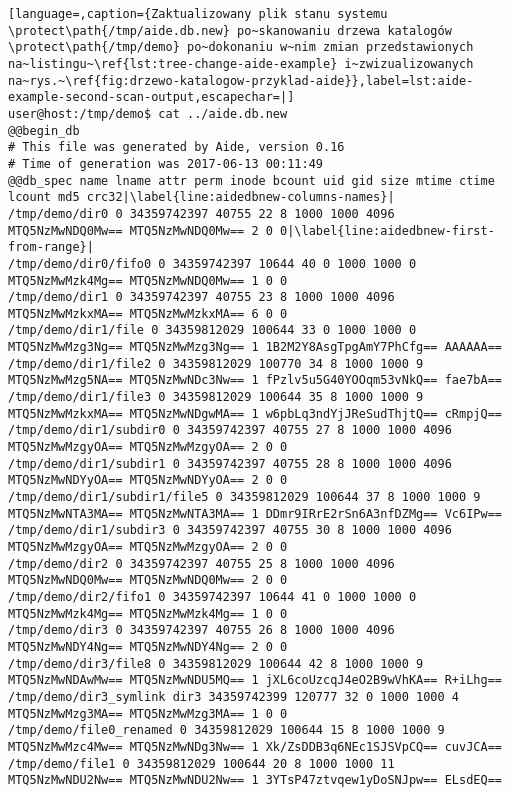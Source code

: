 \documentclass[thesis]{subfiles}
\begin{document}
\begin{appendices}
\begin{minipage}{\linewidth}
\begin{lstlisting}[language=,caption={Zaktualizowany plik stanu systemu \protect\path{/tmp/aide.db.new} po~skanowaniu drzewa katalogów \protect\path{/tmp/demo} po~dokonaniu w~nim zmian przedstawionych na~listingu~\ref{lst:tree-change-aide-example} i~zwizualizowanych na~rys.~\ref{fig:drzewo-katalogow-przyklad-aide}},label=lst:aide-example-second-scan-output,escapechar=|]
user@host:/tmp/demo$ cat ../aide.db.new
@@begin_db
# This file was generated by Aide, version 0.16
# Time of generation was 2017-06-13 00:11:49
@@db_spec name lname attr perm inode bcount uid gid size mtime ctime lcount md5 crc32|\label{line:aidedbnew-columns-names}|
/tmp/demo/dir0 0 34359742397 40755 22 8 1000 1000 4096 MTQ5NzMwNDQ0Mw== MTQ5NzMwNDQ0Mw== 2 0 0|\label{line:aidedbnew-first-from-range}|
/tmp/demo/dir0/fifo0 0 34359742397 10644 40 0 1000 1000 0 MTQ5NzMwMzk4Mg== MTQ5NzMwNDQ0Mw== 1 0 0
/tmp/demo/dir1 0 34359742397 40755 23 8 1000 1000 4096 MTQ5NzMwMzkxMA== MTQ5NzMwMzkxMA== 6 0 0
/tmp/demo/dir1/file 0 34359812029 100644 33 0 1000 1000 0 MTQ5NzMwMzg3Ng== MTQ5NzMwMzg3Ng== 1 1B2M2Y8AsgTpgAmY7PhCfg== AAAAAA==
/tmp/demo/dir1/file2 0 34359812029 100770 34 8 1000 1000 9 MTQ5NzMwMzg5NA== MTQ5NzMwNDc3Nw== 1 fPzlv5u5G40YOOqm53vNkQ== fae7bA==
/tmp/demo/dir1/file3 0 34359812029 100644 35 8 1000 1000 9 MTQ5NzMwMzkxMA== MTQ5NzMwNDgwMA== 1 w6pbLq3ndYjJReSudThjtQ== cRmpjQ==
/tmp/demo/dir1/subdir0 0 34359742397 40755 27 8 1000 1000 4096 MTQ5NzMwMzgyOA== MTQ5NzMwMzgyOA== 2 0 0
/tmp/demo/dir1/subdir1 0 34359742397 40755 28 8 1000 1000 4096 MTQ5NzMwNDYyOA== MTQ5NzMwNDYyOA== 2 0 0
/tmp/demo/dir1/subdir1/file5 0 34359812029 100644 37 8 1000 1000 9 MTQ5NzMwNTA3MA== MTQ5NzMwNTA3MA== 1 DDmr9IRrE2rSn6A3nfDZMg== Vc6IPw==
/tmp/demo/dir1/subdir3 0 34359742397 40755 30 8 1000 1000 4096 MTQ5NzMwMzgyOA== MTQ5NzMwMzgyOA== 2 0 0
/tmp/demo/dir2 0 34359742397 40755 25 8 1000 1000 4096 MTQ5NzMwNDQ0Mw== MTQ5NzMwNDQ0Mw== 2 0 0
/tmp/demo/dir2/fifo1 0 34359742397 10644 41 0 1000 1000 0 MTQ5NzMwMzk4Mg== MTQ5NzMwMzk4Mg== 1 0 0
/tmp/demo/dir3 0 34359742397 40755 26 8 1000 1000 4096 MTQ5NzMwNDY4Ng== MTQ5NzMwNDY4Ng== 2 0 0
/tmp/demo/dir3/file8 0 34359812029 100644 42 8 1000 1000 9 MTQ5NzMwNDAwMw== MTQ5NzMwNDU5MQ== 1 jXL6coUzcqJ4eO2B9wVhKA== R+iLhg==
/tmp/demo/dir3_symlink dir3 34359742399 120777 32 0 1000 1000 4 MTQ5NzMwMzg3MA== MTQ5NzMwMzg3MA== 1 0 0
/tmp/demo/file0_renamed 0 34359812029 100644 15 8 1000 1000 9 MTQ5NzMwMzc4Mw== MTQ5NzMwNDg3Nw== 1 Xk/ZsDDB3q6NEc1SJSVpCQ== cuvJCA==
/tmp/demo/file1 0 34359812029 100644 20 8 1000 1000 11 MTQ5NzMwNDU2Nw== MTQ5NzMwNDU2Nw== 1 3YTsP47ztvqew1yDoSNJpw== ELsdEQ==

\end{lstlisting}
\end{minipage}
\end{appendices}
\end{document}

